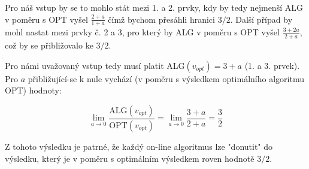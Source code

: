 \documentclass[a4paper, 12pt]{article}
\begin{document}
  Pro náš vstup by se to mohlo stát mezi 1. a 2. prvky, kdy by tedy nejmenší ALG v poměru s OPT vyšel $\frac{2+a}{1+a}$ čímž bychom přesáhli hranici $3/2$. Další případ by mohl nastat mezi prvky č. 2 a 3, pro který by ALG v poměru s OPT vyšel $\frac{3+2a}{2+a}$, což by se přibližovalo ke $3/2$.

  Pro námi uvažovaný vstup tedy musí platit ALG$(v_{opt})=3+a$ (1. a 3. prvek). Pro $a$ přibližující-se k nule vychází (v poměru s výsledkem optimálního algoritmu OPT) hodnoty:

  $$\lim_{a\to0} \frac{\text{ALG}(v_{opt})}{\text{OPT}(v_{opt})}
  =\lim_{a\to0} \frac{3+a}{2+a}
  =\frac{3}{2}$$

  Z tohoto výsledku je patrné, že každý on-line algoritmus lze "donutit" do výsledku, který je v poměru s optimálním výsledkem roven hodnotě $3/2$.
\end{document}
